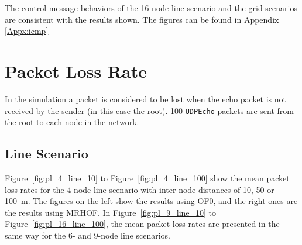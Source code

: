 The control message behaviors of the 16-node line scenario and the grid scenarios are consistent with the results shown. The figures can be found in Appendix \ref{Appx:icmp}

\clearpage
\section{Packet Loss Rate}
\label{pl}

In the simulation a packet is considered to be lost when the echo packet is not received by the sender (in this case the root). 100 \texttt{UDPEcho} packets are sent from the root to each node in the network.

\subsection{Line Scenario}
\label{pl:line}

Figure~\ref{fig:pl_4_line_10} to Figure~\ref{fig:pl_4_line_100} show the mean packet loss rates for the 4-node line scenario with inter-node distances of 10, 50 or 100~m. The figures on the left show the results using OF0, and the right ones are the results using MRHOF. In Figure~\ref{fig:pl_9_line_10} to Figure~\ref{fig:pl_16_line_100}, the mean packet loss rates are presented in the same way for the 6- and 9-node line scenarios.

